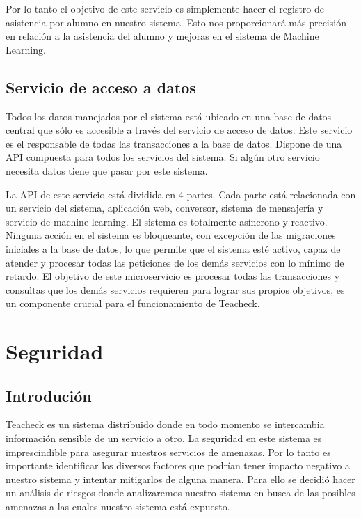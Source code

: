 Por lo tanto el objetivo de este servicio es simplemente hacer el
registro de asistencia por alumno en nuestro sistema. Esto nos
proporcionará más precisión en relación a la asistencia del alumno y
mejoras en el sistema de Machine Learning.

\subsection{Servicio de acceso a datos}
\label{accesoADatos}

Todos los datos manejados por el sistema está ubicado en una base de
datos central que sólo es accesible a través del servicio de acceso de
datos. Este servicio es el responsable de todas las transacciones a la
base de datos. Dispone de una API compuesta para todos los servicios
del sistema. Si algún otro servicio necesita datos tiene que pasar por
este sistema.

La API de este servicio está dividida en 4 partes. Cada parte está
relacionada con un servicio del sistema, aplicación web, conversor,
sistema de mensajería y servicio de machine learning. El sistema es
totalmente asíncrono y reactivo. Ninguna acción en el sistema es
bloqueante, con excepción de las migraciones iniciales a la base de
datos, lo que permite que el sistema esté activo, capaz de atender y
procesar todas las peticiones de los demás servicios con lo mínimo de
retardo. El objetivo de este microservicio es procesar todas las
transacciones y consultas que los demás servicios requieren para
lograr sus propios objetivos, es un componente crucial para el
funcionamiento de Teacheck.

\section{Seguridad}

\subsection{Introdución}

Teacheck es un sistema distribuido donde en todo momento se
intercambia información sensible de un servicio a otro. La seguridad
en este sistema es imprescindible para asegurar nuestros servicios de
amenazas. Por lo tanto es importante identificar los diversos factores
que podrían tener impacto negativo a nuestro sistema y intentar
mitigarlos de alguna manera. Para ello se decidió hacer un análisis de
riesgos donde analizaremos nuestro sistema en busca de las posibles
amenazas a las cuales nuestro sistema está expuesto.

